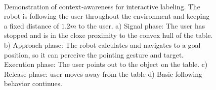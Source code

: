 \documentclass{tADR2e}
\begin{document}
\begin{figure}[h]
\centering
%
          \\
    \caption{Demonstration of context-awareness for interactive labeling. The robot is following the user throughout the environment and keeping a fixed distance of $1.2m$ to the user. a) Signal phase: The user has stopped and is in the cloxe proximity to the convex hull of the table. b) Approach phase: The robot calculates and navigates to a goal position, so it can perceive the pointing gesture and target. Execution phase: The user points out to the object on the table. c) Release phase: user moves away from the table d) Basic following behavior continues.}
   \label{fig:situtation_aware_landmark_labeling}
\end{figure}
\end{document}
